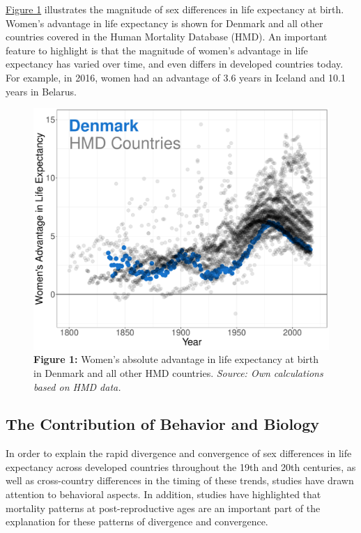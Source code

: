 \hyperref[ch1:fig1]{Figure 1} illustrates the magnitude of sex differences in 
life expectancy at birth. Women's advantage in life expectancy is shown for 
Denmark and all other countries covered in the Human Mortality Database (HMD).\citep{human2005university} 
An important feature to highlight is that the magnitude of women's advantage 
in life expectancy has varied over time, and even differs in developed countries 
today. For example, in 2016, women had an advantage of 3.6 years in Iceland 
and 10.1 years in Belarus.\citep{human2005university} \\


	\begin{figure}[H]
		\centering
		\includegraphics[scale=0.485]{Summary/PLOT/INTRODUCTION/PLOT_INTRO.pdf}
		\caption*{\textbf{Figure 1:} Women's absolute advantage in life expectancy at birth
									 in Denmark and all other HMD countries. 
									 \textit{Source: Own calculations based on HMD data.} }
		\label{ch1:fig1} 
	\end{figure}




\subsection{The Contribution of Behavior and Biology} 

In order to explain the rapid divergence and convergence of sex differences 
in life expectancy across developed countries throughout the 19th and 20th 
centuries, as well as cross-country differences in the timing of these trends, 
studies have drawn attention to behavioral aspects. In addition, studies 
have highlighted that mortality patterns at post-reproductive ages are an 
important part of the explanation for these patterns of divergence and 
convergence.\citep{thorslund2013,beltran2015}

